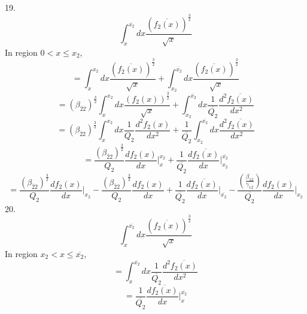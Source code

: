 \documentclass[fleqn, 10pt]{article}
\begin{document}
19. 
\begin{equation*}
    \int^{\overline{x_{2}}}_{x} dx \frac{(\overline{f_{2}(x)})^\frac{3}{2}}{\sqrt{x}}
\end{equation*}
In region $0<x\leq x_{2}$,
\begin{equation*}
    = \int^{x_{2}}_{x} dx \frac{(\overline{f_{2}(x)})^\frac{3}{2}}{\sqrt{x}} + \int^{\overline{x_{2}}}_{x_{2}} dx \frac{(\overline{f_{2}(x)})^\frac{3}{2}}{\sqrt{x}}
\end{equation*}
\begin{equation*}
    = (\beta_{\overline{2}2})^\frac{3}{2} \int^{x_{2}}_{x} dx \frac{(f_{2}(x))^\frac{3}{2}}{\sqrt{x}} + \int^{\overline{x_{2}}}_{x_{2}} dx \frac{1}{\overline{Q_{2}}} \frac{d^2\overline{f_{2}(x)}}{dx^2}
\end{equation*}
\begin{equation*}
    = (\beta_{\overline{2}2})^\frac{3}{2} \int^{x_{2}}_{x} dx \frac{1}{Q_{2}} \frac{d^2f_{2}(x)}{dx^2} + \frac{1}{\overline{Q_{2}}} \int^{\overline{x_{2}}}_{x_{2}} dx \frac{d^2\overline{f_{2}(x)}}{dx^2}
\end{equation*}
\begin{equation*}
    =   \frac{(\beta_{\overline{2}2})^\frac{3}{2}}{Q_{2}} \frac{df_{2}(x)}{dx}\Bigg|^{x_{2}}_{x} +   \frac{1}{\overline{Q_{2}}} \frac{d\overline{f_{2}(x)}}{dx}\Bigg|^{\overline{x_{2}}}_{x_{2}}
\end{equation*}
\begin{equation}
    =   \frac{(\beta_{\overline{2}2})^\frac{3}{2}}{Q_{2}} \frac{df_{2}(x)}{dx}\Bigg|_{x_{2}} - \frac{(\beta_{\overline{2}2})^\frac{3}{2}}{Q_{2}} \frac{df_{2}(x)}{dx} +   \frac{1}{\overline{Q_{2}}} \frac{d\overline{f_{2}(x)}}{dx}\Bigg|_{\overline{x_{2}}} -   \frac{\left(\frac{\beta_{12}}{\gamma_{1\overline{2}}}\right)}{\overline{Q_{2}}} \frac{df_{2}(x)}{dx}\Bigg|_{x_{2}}
    \label{57}
\end{equation}
20.
\begin{equation*}
    \int^{\overline{x_{2}}}_{x} dx \frac{(\overline{f_{2}(x)})^\frac{3}{2}}{\sqrt{x}}
\end{equation*}
In region $x_{2}<x \leq \overline{x_{2}}$,
\begin{equation*}
    = \int^{\overline{x_{2}}}_{x} dx \frac{1}{\overline{Q_{2}}}\frac{d^2\overline{f_{2}(x)}}{dx^2}
\end{equation*}
\begin{equation*}
    =   \frac{1}{\overline{Q_{2}}} \frac{d\overline{f_{2}(x)}}{dx} \Bigg|^{\overline{x_{2}}}_{x}
\end{equation*}
\end{document}
